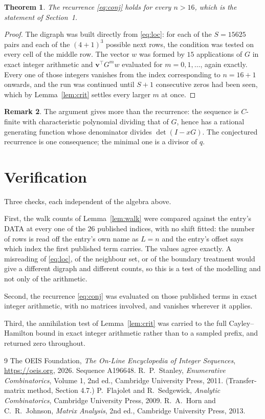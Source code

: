 \documentclass[11pt,a4paper]{article}
\theoremstyle{plain}
\newtheorem{theorem}{Theorem}
\theoremstyle{definition}
\newtheorem{remark}[theorem]{Remark}
\begin{document}
\begin{theorem}
The recurrence \eqref{eq:conj} holds for every $n>16$, which is the statement of
Section~1.
\end{theorem}

\begin{proof}
The digraph was built directly from \eqref{eq:loc}: for each of the $S=15625$ pairs and each
of the $(4+1)^{3}$ possible next rows, the condition was tested on every cell of
the middle row. The vector $w$ was formed by $15$ applications of $G$ in exact integer
arithmetic and $\mathbf{v}^{\!\top}G^{m}w$ evaluated for $m=0,1,\dots$, again exactly.
Every one of those integers vanishes from the index corresponding to $n=16+1$ onwards,
and the run was continued until $S+1$ consecutive zeros had been seen, which by
Lemma~\ref{lem:crit} settles every larger $m$ at once.
\end{proof}

\begin{remark}
The argument gives more than the recurrence: the sequence is $C$-finite with characteristic
polynomial dividing that of $G$, hence has a rational generating function whose denominator
divides $\det(I-xG)$. The conjectured recurrence is one consequence; the minimal one is a
divisor of $q$.
\end{remark}

\section{Verification}

Three checks, each independent of the algebra above.

First, the walk counts of Lemma~\ref{lem:walk} were compared against the entry's DATA at
every one of the $26$ published indices, with no shift fitted: the number of rows is
read off the entry's own name as $L=n$ and the entry's offset says which index the first
published term carries. The values agree exactly. A misreading of \eqref{eq:loc}, of the
neighbour set, or of the boundary treatment would give a different digraph and different
counts, so this is a test of the modelling and not only of the arithmetic.

Second, the recurrence \eqref{eq:conj} was evaluated on those published terms in exact
integer arithmetic, with no matrices involved, and vanishes wherever it applies.

Third, the annihilation test of Lemma~\ref{lem:crit} was carried to the full
Cayley--Hamilton bound in exact integer arithmetic rather than to a sampled prefix, and
returned zero throughout.

\begin{thebibliography}{9}
 The OEIS Foundation, \emph{The On-Line Encyclopedia of Integer
Sequences}, \url{https://oeis.org}, 2026. Sequence A196648.
 R.~P.~Stanley, \emph{Enumerative Combinatorics}, Volume 1, 2nd ed.,
Cambridge University Press, 2011. (Transfer-matrix method, Section 4.7.)
 P.~Flajolet and R.~Sedgewick, \emph{Analytic Combinatorics}, Cambridge
University Press, 2009.
 R.~A.~Horn and C.~R.~Johnson, \emph{Matrix Analysis}, 2nd ed., Cambridge
University Press, 2013.
\end{thebibliography}
\end{document}
